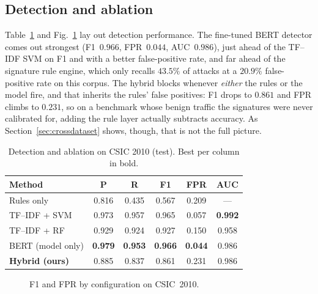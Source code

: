 \documentclass[conference]{IEEEtran}
\begin{document}
\subsection{Detection and ablation}
Table~\ref{tab:main} and Fig.~\ref{fig:bars} lay out detection
performance. The fine-tuned BERT detector comes out strongest
(F1~$0.966$, FPR~$0.044$, AUC~$0.986$), just ahead of the TF--IDF SVM on
F1 and with a better false-positive rate, and far ahead of the
signature rule engine, which only recalls $43.5\%$ of attacks at a
$20.9\%$ false-positive rate on this corpus. The hybrid blocks whenever
\emph{either} the rules or the model fire, and that inherits the rules'
false positives: F1 drops to $0.861$ and FPR climbs to $0.231$, so on a
benchmark whose benign traffic the signatures were never calibrated for,
adding the rule layer actually subtracts accuracy. As
Section~\ref{sec:crossdataset} shows, though, that is not the full
picture.

\begin{table}[t]
\centering
\caption{Detection and ablation on CSIC 2010 (test). Best per column in bold.}
\label{tab:main}
\begin{tabular}{@{}lccccc@{}}
\toprule
Method & P & R & F1 & FPR & AUC \\
\midrule
Rules only            & 0.816 & 0.435 & 0.567 & 0.209 & --- \\
TF--IDF + SVM         & 0.973 & 0.957 & 0.965 & 0.057 & \textbf{0.992} \\
TF--IDF + RF          & 0.929 & 0.924 & 0.927 & 0.150 & 0.958 \\
BERT (model only)     & \textbf{0.979} & \textbf{0.953} & \textbf{0.966} & \textbf{0.044} & 0.986 \\
\textbf{Hybrid (ours)}& 0.885 & 0.837 & 0.861 & 0.231 & 0.986 \\
\bottomrule
\end{tabular}
\end{table}

\begin{figure}[t]
\centering
{}
\caption{F1 and FPR by configuration on CSIC~2010.}
\label{fig:bars}
\end{figure}
\end{document}
